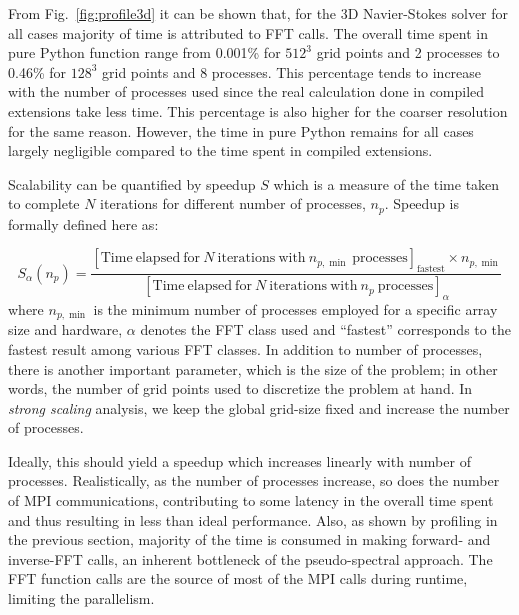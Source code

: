 From Fig.~\ref{fig:profile3d} it can be shown that, for the 3D Navier-Stokes
solver for all cases majority of time is attributed to FFT calls. The overall time
spent in pure Python function range from 0.001\% for $512^3$ grid points and 2
processes to 0.46\% for $128^3$ grid points and 8 processes.
%
This percentage tends to increase with the number of processes used since the real
calculation done in compiled extensions take less time.
%
This percentage is also higher for the coarser resolution for the same reason.
%
However, the time in pure Python remains for all cases largely negligible compared
to the time spent in compiled extensions.



Scalability can be quantified by speedup $S$ which is a measure of the time taken
to complete $N$ iterations for different number of processes, $n_p$.
Speedup is formally defined here as:

\begin{equation}
S_\alpha(n_p) = \frac
{[\mathrm{Time\ elapsed\ for\ } N \mathrm{\ iterations\ with\ }n_{p,\min}\mathrm{\ processes}]_{\mathrm{fastest}}
\times n_{p,\min}}
{[\mathrm{Time\ elapsed\ for\ } N \mathrm{\ iterations\ with\ } n_p \mathrm{\
processes}]_\alpha}
\label{eq:speedup}
\end{equation}
where $n_{p,\min}$ is the minimum number of processes employed for a specific
array size and hardware, $\alpha$ denotes the FFT class used and ``fastest''
corresponds to the fastest result among various FFT classes.
%
In addition to number of processes, there is another important parameter, which
is the size of the problem; in other words, the number of grid points used to
discretize the problem at hand.
%
In \emph{strong scaling} analysis, we keep the global grid-size fixed and
increase the number of processes.

Ideally, this should yield a speedup which increases linearly with number of
processes.  Realistically, as the number of processes increase, so does the
number of MPI communications, contributing to some latency in the overall time
spent and thus resulting in less than ideal performance.
%
Also, as shown by profiling in the previous section, majority of the time is
consumed in making forward- and inverse-FFT calls, an inherent bottleneck of
the pseudo-spectral approach. The FFT function calls are the source of most of
the MPI calls during runtime, limiting the parallelism.

